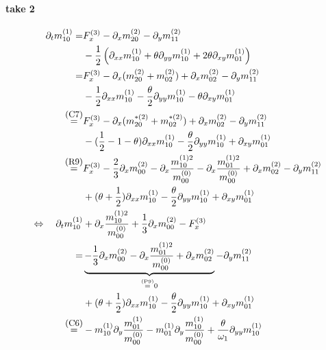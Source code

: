 \documentclass{article}
\begin{document}
\newpage
\paragraph{take 2}
\begin{align*}
  \partial_t m_{10}^{(1)}
    =&
    F_x^{(3)}
    - \partial_x m_{20}^{(2)} - \partial_y m_{11}^{(2)} \\
    &
    - \frac{1}{2} \left(\partial_{xx} m_{10}^{(1)} + \theta\partial_{yy} m_{10}^{(1)} + 2\theta\partial_{xy} m_{01}^{(1)}\right)
    \\=&
    F_x^{(3)}
    - \partial_x (m_{20}^{(2)} + m_{02}^{(2)}) + \partial_x m_{02}^{(2)} - \partial_y m_{11}^{(2)}
    \\ &
    - \frac{1}{2} \partial_{xx} m_{10}^{(1)} - \frac{\theta}{2}\partial_{yy} m_{10}^{(1)} - \theta\partial_{xy} m_{01}^{(1)}
    \\ \overset{\text{\small(C7)}}{=} &
    F_x^{(3)}
    - \partial_x (m_{20}^{*(2)} + m_{02}^{*(2)}) + \partial_x m_{02}^{(2)} - \partial_y m_{11}^{(2)}
    \\ &
    - (\frac{1}{2}-1-\theta) \partial_{xx} m_{10}^{(1)} - \frac{\theta}{2}\partial_{yy} m_{10}^{(1)} + \partial_{xy} m_{01}^{(1)}
    \\ \overset{\text{\small(R9)}}{=} &
    F_x^{(3)}
    - \frac{2}{3}\partial_x m_{00}^{(2)}
    - \partial_x \frac{ m_{10}^{(1)2}}{ m_{00}^{(0)}}
    - \partial_x \frac{ m_{01}^{(1)2}}{ m_{00}^{(0)}}
    + \partial_x m_{02}^{(2)} - \partial_y m_{11}^{(2)}
    \\ &
    + (\theta + \frac{1}{2}) \partial_{xx} m_{10}^{(1)} - \frac{\theta}{2}\partial_{yy} m_{10}^{(1)} + \partial_{xy} m_{01}^{(1)}
    \\\Leftrightarrow\quad   \partial_t m_{10}^{(1)} &
    + \partial_x \frac{ m_{10}^{(1)2}}{ m_{00}^{(0)}}
    + \frac{1}{3}\partial_x m_{00}^{(2)}
    - F_x^{(3)}
    \\ = &
    \underbrace{- \frac{1}{3}\partial_x m_{00}^{(2)}
    - \partial_x \frac{ m_{01}^{(1)2}}{ m_{00}^{(0)}}
    + \partial_x m_{02}^{(2)}}_{\overset{\text{\tiny(P9)}}{=} 0}
    - \partial_y m_{11}^{(2)}
    \\ &
    + (\theta + \frac{1}{2}) \partial_{xx} m_{10}^{(1)} - \frac{\theta}{2}\partial_{yy} m_{10}^{(1)} + \partial_{xy} m_{01}^{(1)}
    \\ \overset{\text{\small(C6)}}{=} &
    -m_{10}^{(1)}\partial_y \frac{ m_{01}^{(1)}}{m_{00}^{(0)}}
    -m_{01}^{(1)}\partial_y \frac{ m_{10}^{(1)}}{m_{00}^{(0)}}
    + \frac{\theta}{\omega_1}\partial_{yy} m_{10}^{(1)}

\end{align*}
\end{document}
